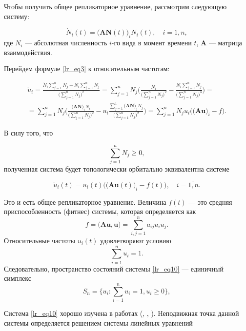 Чтобы получить общее репликаторное уравнение, рассмотрим следующую систему:

\begin{equation}
\dot{N}_{i}(t) = \Big(\mathbf{AN}(t)\Big)_{i}N_{i}(t), \quad i = \overline{1, n},
\label{lr_eq9}
\end{equation} 
где $N_{i}$ --- абсолютная численность $i$-го вида в момент времени $t$, $\mathbf{A}$ --- матрица взаимодействия.

Перейдем формуле \eqref{lr_eq3} к относительным частотам:

\begin{multline*}
\dot{u}_{i} = \frac{\dot{N}_{i}\sum\limits_{j = 1}^{n}N_{j} - N_{i}\sum\limits_{j = 1}^{n}\dot{N}_{j}}{\Big(\sum\limits_{j = 1}^{n}N_{j}\Big)^{2}} = \sum\limits_{j = 1}^{n}N_{j}\Bigg(\frac{\dot{N}_{i}}{\Big(\sum\limits_{j = 1}^{n}N_{j}\Big)^{2}} - \frac{N_{i}\sum\limits_{j = 1}^{n}\dot{N}_{j}}{\Big(\sum\limits_{j = 1}^{n}N_{j}\Big)^{3}}\Bigg) = \\ 
= \sum\limits_{j = 1}^{n}N_{j}\Bigg(\frac{\Big(\mathbf{AN}\Big)_{i}N_{i}}{\Big(\sum\limits_{j = 1}^{n}N_{j}\Big)^{2}} - u_{i}\frac{\sum\limits_{j = 1}^{1}\Big(\mathbf{AN}\Big)_{j}N_{j}}{\Big(\sum\limits_{j = 1}^{n}N_{j}\Big)^{2}}\Bigg) = \sum\limits_{j = 1}^{n}N_{j}u_{i}\Bigg(\Big(\mathbf{Au}\Big)_{i} - f\Bigg).
\end{multline*} 

В силу того, что

$$
\sum\limits_{j = 1}^{n}N_{j} \ge 0,
$$
полученная система будет топологически орбитально эквивалентна системе \cite{Arnold}

\begin{equation}
\dot{u}_{i}(t) = u_{i}(t)\Bigg(\Big(\mathbf{Au}(t)\Big)_{i} - f(t)\Bigg), \quad i = \overline{1, n}.
\label{lr_eq10}
\end{equation}

Это и есть общее репликаторное уравнение. Величина $f(t)$ --- это средняя приспособленность (фитнес) системы, которая определяется как 
$$
f = \Big(\mathbf{Au, u}\Big) = \sum\limits_{i,j = 1}^{n}a_{ij}u_{i}u_{j}.
$$
Относительные частоты $u_{i}(t)$ удовлетворяют условию 
$$
\sum\limits_{i = 1}^{n} u_{i} = 1.
$$ 
Следовательно, пространство состояний системы \eqref{lr_eq10} --- единичный симплекс
$$
S_{n} = \Bigg\{u_{i}: \sum\limits_{i = 1}^{n} u_{i} = 1, u_{i} \ge 0 \Bigg\},
$$    

Система \eqref{lr_eq10} хорошо изучена в работах (\cite{Eig4}, \cite{Eig5}, \cite{Cressman}). Неподвижная точка данной системы определяется решением системы линейных уравнений

